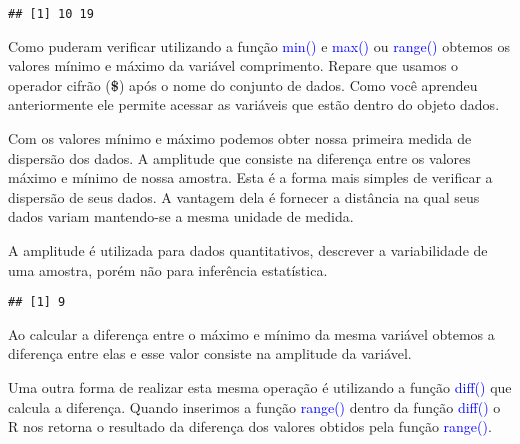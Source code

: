 \documentclass[14pt,titlepage, oneside, openany, a4paper]{book}
\newenvironment{Shaded}{\begin{snugshade}}{\end{snugshade}}
\newcommand{\KeywordTok}[1]{\textcolor[rgb]{0.13,0.29,0.53}{\textbf{#1}}}
\newcommand{\NormalTok}[1]{#1}
\newcommand{\OperatorTok}[1]{\textcolor[rgb]{0.81,0.36,0.00}{\textbf{#1}}}
\newcommand{\StringTok}[1]{\textcolor[rgb]{0.31,0.60,0.02}{#1}}
\begin{document}
\begin{Shaded}
\end{Shaded}

\begin{verbatim}
## [1] 10 19
\end{verbatim}

Como puderam verificar utilizando a função \textcolor{blue}{min()} e \textcolor{blue}{max()} ou \textcolor{blue}{range()} obtemos os valores mínimo e máximo da variável comprimento. Repare que usamos o operador cifrão (\textbf{\$}) após o nome do conjunto de dados. Como você aprendeu anteriormente ele permite acessar as variáveis que estão dentro do objeto dados.

Com os valores mínimo e máximo podemos obter nossa primeira medida de dispersão dos dados. A amplitude que consiste na diferença entre os valores máximo e mínimo de nossa amostra. Esta é a forma mais simples de verificar a dispersão de seus dados. A vantagem dela é fornecer a distância na qual seus dados variam mantendo-se a mesma unidade de medida.

A amplitude é utilizada para dados quantitativos, descrever a variabilidade de uma amostra, porém não para inferência estatística.

\begin{Shaded}
\end{Shaded}

\begin{verbatim}
## [1] 9
\end{verbatim}

Ao calcular a diferença entre o máximo e mínimo da mesma variável obtemos a diferença entre elas e esse valor consiste na amplitude da variável.

Uma outra forma de realizar esta mesma operação é utilizando a função \textcolor{blue}{diff()} que calcula a diferença. Quando inserimos a função \textcolor{blue}{range()} dentro da função \textcolor{blue}{diff()} o R nos retorna o resultado da diferença dos valores obtidos pela função \textcolor{blue}{range()}.
\end{document}
